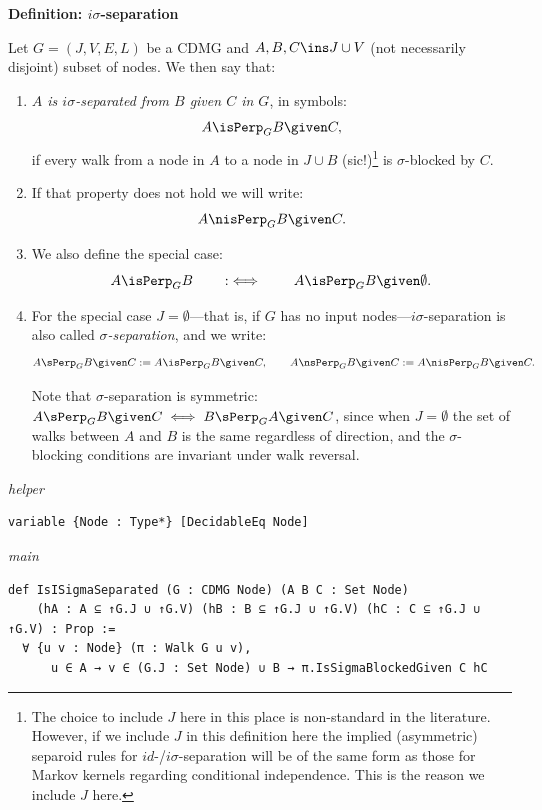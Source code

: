 \noindent\textbf{Definition: $i\sigma$-separation}\par\smallskip
{\appendixTexSize
\label{def:sigma_separation}
    Let $G=(J,V,E,L)$ be a CDMG and $A,B,C \ins J \cup V$ (not necessarily disjoint) subset of nodes.
    We then say that:
    \begin{enumerate}
        \item \emph{$A$ is $i\sigma$-separated from $B$ given $C$ in $G$}, in symbols:
    \[ A \isPerp_G B \given C, \]
    if every walk from a node in $A$ to a node in $J \cup B$ (sic!)\footnote{The choice to include $J$ here in this place is non-standard in the literature. However, if we include $J$ in this definition here the implied (asymmetric) separoid rules for $id$-/$i\sigma$-separation will be of the same form as those for Markov kernels regarding conditional independence. This is the reason we include $J$ here.\label{fn:why-J}} is $\sigma$-blocked by $C$.
        \item If that property does not hold we will write:
            \[ A \nisPerp_G B \given C. \]
        \item We also define the special case:
                \[ A \isPerp_G B \qquad :\iff \qquad A \isPerp_G B \given \emptyset.\]
        \item For the special case $J = \emptyset$---that is, if $G$ has no input nodes---$i\sigma$-separation is also called \emph{$\sigma$-separation}, and we write:
          \[A \sPerp_G B \given C := A \isPerp_G B \given C, \qquad A \nsPerp_G B \given C := A \nisPerp_G B \given C.\]
          \begin{claimmark}
          Note that $\sigma$-separation is symmetric: $A \sPerp_G B \given C \iff B \sPerp_G A \given C$, since when $J = \emptyset$ the set of walks between $A$ and $B$ is the same regardless of direction, and the $\sigma$-blocking conditions are invariant under walk reversal.
          \end{claimmark}
    \end{enumerate}
\par}
\smallskip
{\small\textit{helper}}
\begin{verbatim}
variable {Node : Type*} [DecidableEq Node]
\end{verbatim}
{\small\textit{main}}
\begin{verbatim}
def IsISigmaSeparated (G : CDMG Node) (A B C : Set Node)
    (hA : A ⊆ ↑G.J ∪ ↑G.V) (hB : B ⊆ ↑G.J ∪ ↑G.V) (hC : C ⊆ ↑G.J ∪ ↑G.V) : Prop :=
  ∀ {u v : Node} (π : Walk G u v),
      u ∈ A → v ∈ (G.J : Set Node) ∪ B → π.IsSigmaBlockedGiven C hC
\end{verbatim}

